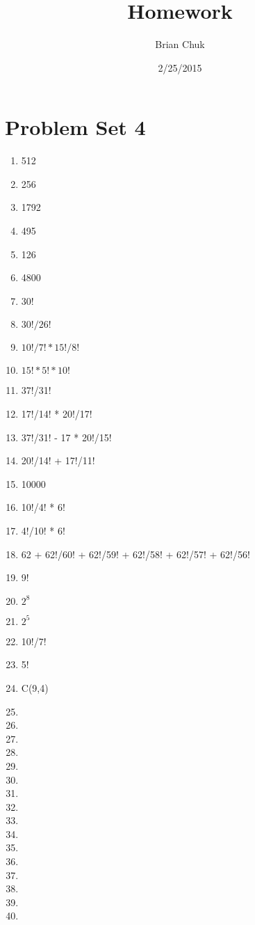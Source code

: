 \documentclass[11pt]{article}
\title{\textbf{Homework}}
\author{Brian Chuk}
\date{2/25/2015}
\begin{document}
\maketitle

\section{Problem Set 4}
\begin{enumerate}

\item 512
\item 256
\item 1792
\item 495
\item 126
\item 4800
\item 30!
\item $30!/26!$
\item $10!/7! * 15!/8!$
\item $15! * 5! * 10!$
\item 37!/31!
\item 17!/14! * 20!/17!
\item 37!/31! - 17 * 20!/15!
\item 20!/14! + 17!/11!
\item 10000
\item 10!/4! * 6!
\item 4!/10! * 6!
\item 62 + 62!/60! + 62!/59! + 62!/58! + 62!/57! + 62!/56!
\item 9!
\item $2^8$
\item $2^5$
\item 10!/7!
\item 5!
\item C(9,4)
\item
\item 
\item 
\item 
\item 
\item 
\item 
\item 
\item 
\item 
\item 
\item 
\item 
\item 
\item 
\item 
\end{enumerate}
\end{document}

